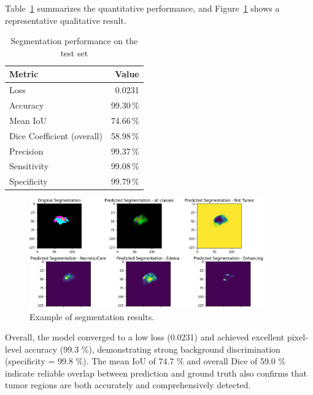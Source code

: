 Table~\ref{tab:segmentation-results} summarizes the quantitative performance, and Figure~\ref{fig:segmentation-example} shows a representative qualitative result.
\begin{table}[ht]
  \centering
  \caption{Segmentation performance on the test set}
  \label{tab:segmentation-results}
  \begin{tabular}{l r}
    \hline
    \textbf{Metric}            & \textbf{Value} \\
    \hline
    Loss                       & 0.0231         \\
    Accuracy                   & 99.30\,\%      \\
    Mean IoU                   & 74.66\,\%      \\
    Dice Coefficient (overall) & 58.98\,\%      \\
    Precision                  & 99.37\,\%      \\
    Sensitivity                & 99.08\,\%      \\
    Specificity                & 99.79\,\%      \\
    \hline
  \end{tabular}
\end{table}

\begin{figure}[h]
  \centering
  \includegraphics[width=0.9\textwidth]{Images/Chapter3/seg.png}
  \caption{Example of segmentation results.}
  \label{fig:segmentation-example}
\end{figure}




Overall, the model converged to a low loss (0.0231) and achieved excellent pixel‐level accuracy (99.3 \%), demonstrating strong background discrimination (specificity = 99.8 \%). The mean IoU of 74.7 \% and overall Dice of 59.0 \% indicate reliable overlap between prediction and ground truth also confirms that tumor regions are both accurately and comprehensively detected.


